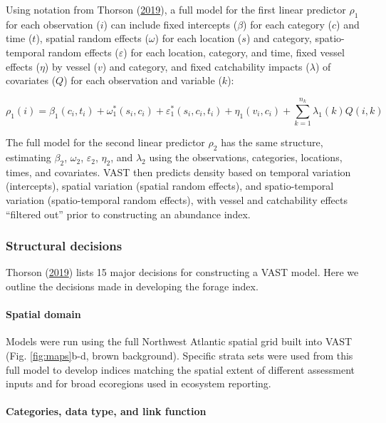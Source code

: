\documentclass[
]{article}
\begin{document}
Using notation from Thorson (\protect\hyperlink{ref-thorson_guidance_2019}{2019}), a full model for the first linear predictor \(\rho_1\) for each observation (\(i\)) can include fixed intercepts (\(\beta\)) for each category (\(c\)) and time (\(t\)), spatial random effects (\(\omega\)) for each location (\(s\)) and category, spatio-temporal random effects (\(\varepsilon\)) for each location, category, and time, fixed vessel effects (\(\eta\)) by vessel (\(v\)) and category, and fixed catchability impacts (\(\lambda\)) of covariates (\(Q\)) for each observation and variable (\(k\)):

\[ \rho_1(i) = \beta_1(c_i, t_i) + \omega_1^*(s_i, c_i) + \varepsilon_1^*(s_i, c_i, t_i) + \eta_1(v_i, c_i) + \sum_{k=1}^{n_k} \lambda_1(k) Q(i,k)\]

The full model for the second linear predictor \(\rho_2\) has the same structure, estimating \(\beta_2\), \(\omega_2\), \(\varepsilon_2\), \(\eta_2\), and \(\lambda_2\) using the observations, categories, locations, times, and covariates. VAST then predicts density based on temporal variation (intercepts), spatial variation (spatial random effects), and spatio-temporal variation (spatio-temporal random effects), with vessel and catchability effects ``filtered out'' prior to constructing an abundance index.

\hypertarget{structural-decisions}{%
\subsubsection{Structural decisions}\label{structural-decisions}}

Thorson (\protect\hyperlink{ref-thorson_guidance_2019}{2019}) lists 15 major decisions for constructing a VAST model. Here we outline the decisions made in developing the forage index.

\hypertarget{spatial-domain}{%
\paragraph{Spatial domain}\label{spatial-domain}}

Models were run using the full Northwest Atlantic spatial grid built into VAST (Fig. \ref{fig:maps}b-d, brown background). Specific strata sets were used from this full model to develop indices matching the spatial extent of different assessment inputs and for broad ecoregions used in ecosystem reporting.

\hypertarget{categories-data-type-and-link-function}{%
\paragraph{Categories, data type, and link function}\label{categories-data-type-and-link-function}}
\end{document}
